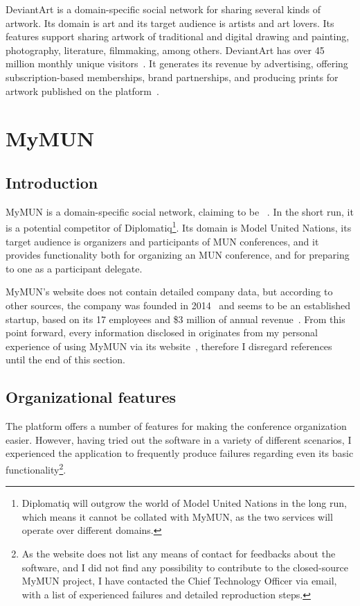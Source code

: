 DeviantArt is a domain-specific social network for sharing several kinds of artwork. Its domain is art and its target audience is artists and art lovers. Its features support sharing artwork of traditional and digital drawing and painting, photography, literature, filmmaking, among others. DeviantArt has over 45 million monthly unique visitors~\cite{about-deviantart}. It generates its revenue by advertising, offering subscription-based memberships, brand partnerships, and producing prints for artwork published on the platform~\cite{deviantart-revenue}.

\section{MyMUN}
\label{section:mymun}

\subsection{Introduction}

MyMUN is a domain-specific social network, claiming to be ~\cite{mymunwebsite}. In the short run, it is a potential competitor of Diplomatiq\footnote{Diplomatiq will outgrow the world of Model United Nations in the long run, which means it cannot be collated with MyMUN, as the two services will operate over different domains.}. Its domain is Model United Nations, its target audience is organizers and participants of MUN conferences, and it provides functionality both for organizing an MUN conference, and for preparing to one as a participant delegate.

MyMUN's website does not contain detailed company data, but according to other sources, the company was founded in 2014~\cite{mymunfacebook} and seems to be an established startup, based on its 17 employees and \$3 million of annual revenue~\cite{mymunzoominfo}. From this point forward, every information disclosed in  originates from my personal experience of using MyMUN via its website~\cite{mymunwebsite}, therefore I disregard references until the end of this section.

\subsection{Organizational features}

The platform offers a number of features for making the conference organization easier. However, having tried out the software in a variety of different scenarios, I experienced the application to frequently produce failures regarding even its basic functionality\footnote{As the website does not list any means of contact for feedbacks about the software, and I did not find any possibility to contribute to the closed-source MyMUN project, I have contacted the Chief Technology Officer via email, with a list of experienced failures and detailed reproduction steps.}.

